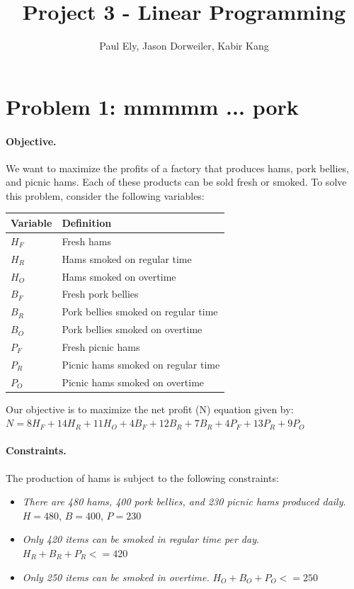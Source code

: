 \documentclass[11pt,letterpaper]{article}
\author{Paul Ely, Jason Dorweiler, Kabir Kang}
\title{Project 3 - Linear Programming}
\begin{document}
\maketitle

\section*{Problem 1: mmmmm ... pork}

\paragraph{Objective.} We want to maximize the profits of a factory that produces hams, pork bellies, and picnic hams. Each of these products can be sold fresh or smoked. To solve this problem, consider the following variables: \\

\begin{tabular}{ll}
Variable & Definition \\
\hline
$H_F$ & Fresh hams \\
$H_R$ & Hams smoked on regular time \\
$H_O$ & Hams smoked on overtime \\
$B_F$ & Fresh pork bellies \\
$B_R$ & Pork bellies smoked on regular time \\
$B_O$ & Pork bellies smoked on overtime \\
$P_F$ & Fresh picnic hams \\
$P_R$ & Picnic hams smoked on regular time \\
$P_O$ & Picnic hams smoked on overtime \\
\end{tabular}

Our objective is to maximize the net profit (N) equation given by:
$N = 8 H_F + 14 H_R + 11 H_O + 4 B_F + 12 B_R + 7 B_R + 4 P_F + 13 P_R + 9 P_O$

\paragraph{Constraints.} The production of hams is subject to the following constraints:

\begin{itemize}
\item[] \textit{There are 480 hams, 400 pork bellies, and 230 picnic hams produced daily}. $H = 480$, $B = 400$, $P = 230$
\item[] \textit{Only 420 items can be smoked in regular time per day}. $H_R + B_R + P_R <= 420$
\item[] \textit{Only 250 items can be smoked in overtime.} $H_O + B_O + P_O <= 250$
\end{itemize}
\end{document}
